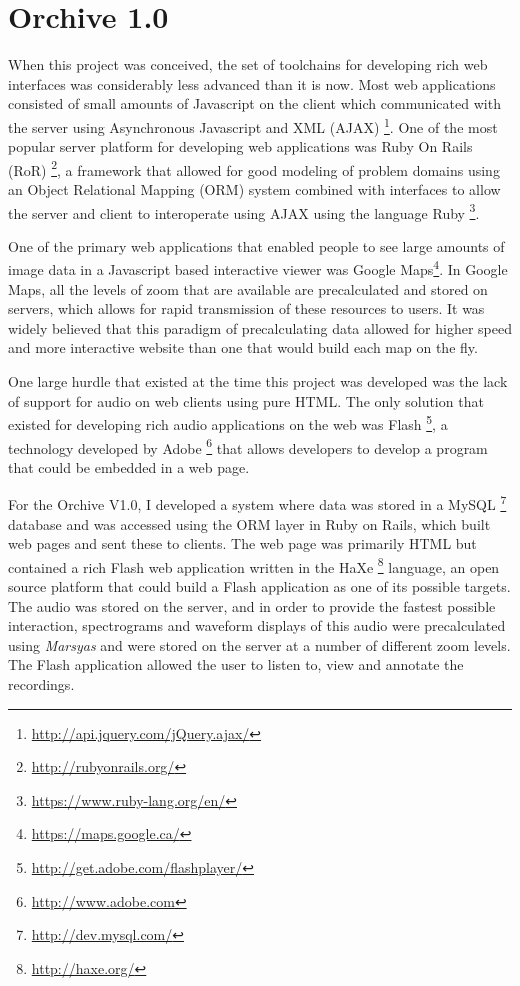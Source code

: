 \documentclass[12pt,oneside]{book}
\begin{document}
\section{Orchive 1.0}
\label{section:softwareAndSystems:orchiveV1}

When this project was conceived, the set of toolchains for developing
rich web interfaces was considerably less advanced than it is now.
Most web applications consisted of small amounts of Javascript on the
client which communicated with the server using Asynchronous
Javascript and XML
(AJAX) \footnote{\url{http://api.jquery.com/jQuery.ajax/}}.  One of
the most popular server platform for developing web applications was
Ruby On Rails (RoR) \footnote{\url{http://rubyonrails.org/}}, a
framework that allowed for good modeling of problem domains using an
Object Relational Mapping (ORM) system combined with interfaces to
allow the server and client to interoperate using AJAX using the
language Ruby \footnote{\url{https://www.ruby-lang.org/en/}}.

One of the primary web applications that enabled people to see large
amounts of image data in a Javascript based interactive viewer was
Google Maps\footnote{\url{https://maps.google.ca/}}.  In Google Maps,
all the levels of zoom that are available are precalculated and stored
on servers, which allows for rapid transmission of these resources to
users.  It was widely believed that this paradigm of precalculating
data allowed for higher speed and more interactive website than one
that would build each map on the fly.

One large hurdle that existed at the time this project was developed
was the lack of support for audio on web clients using pure HTML.  The
only solution that existed for developing rich audio applications on
the web was Flash \footnote{\url{http://get.adobe.com/flashplayer/}},
a technology developed by Adobe \footnote{\url{http://www.adobe.com}}
that allows developers to develop a program that could be embedded in
a web page.

For the Orchive V1.0, I developed a system where data was stored in a
MySQL \footnote{\url{http://dev.mysql.com/}} database and was accessed
using the ORM layer in Ruby on Rails, which built web pages and sent
these to clients.  The web page was primarily HTML but contained a
rich Flash web application written in the
HaXe \footnote{\url{http://haxe.org/}} language, an open source
platform that could build a Flash application as one of its possible
targets.  The audio was stored on the server, and in order to provide
the fastest possible interaction, spectrograms and waveform displays
of this audio were precalculated using
\textit{Marsyas}\cite{tzanetakis2008marsyas} and were stored on the server at a
number of different zoom levels.  The Flash application allowed the
user to listen to, view and annotate the recordings.
\end{document}
